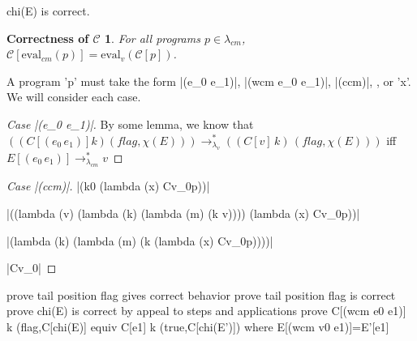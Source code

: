 \documentclass[ms,electronic,twosidetoc,letterpaper,chaptercenter,parttop]{byumsphd}
\begin{document}
\begin{lemma}
chi(E) is correct.
\end{lemma}



\newtheorem*{maintheorem}{Correctness of $\mathcal{C}$}
\begin{maintheorem}
For all programs $p\in\lambda_{cm}$, $\mathcal{C}[\mathrm{eval}_{cm}(p)]=\mathrm{eval}_{v}(\mathcal{C}[p])$.
\end{maintheorem}
A program \scheme'p' must take the form \scheme|(e_0 e_1)|, \scheme|(wcm e_0 e_1)|, \scheme|(ccm)|, , or \scheme'x'. We will consider each case.

\begin{proof}[Case \scheme|(e_0 e_1)|]

By some lemma, we know that $((C[(e_0\,e_1)] k) (flag,\chi(E)))\rightarrow_{\lambda_{v}}^{*}((C[v]\,k)\,(flag,\chi(E)))$ iff $E[(e_0\,e_1)]\rightarrow_{\lambda_{cm}}^{*}v$
\end{proof}

\begin{proof}[Case \scheme|(ccm)|]

\scheme|(k0 (lambda (x) Cv_0p))|

\scheme|((lambda (v) (lambda (k) (lambda (m) (k v)))) (lambda (x) Cv_0p))|

\scheme|(lambda (k) (lambda (m) (k (lambda (x) Cv_0p))))|

\scheme|Cv_0|
\end{proof}

prove tail position flag gives correct behavior
prove tail position flag is correct
prove chi(E) is correct by appeal to steps and applications
prove C[(wcm e0 e1)] k (flag,C[chi(E)] equiv C[e1] k (true,C[chi(E')]) where E[(wcm v0 e1)]=E'[e1]

\end{document}
